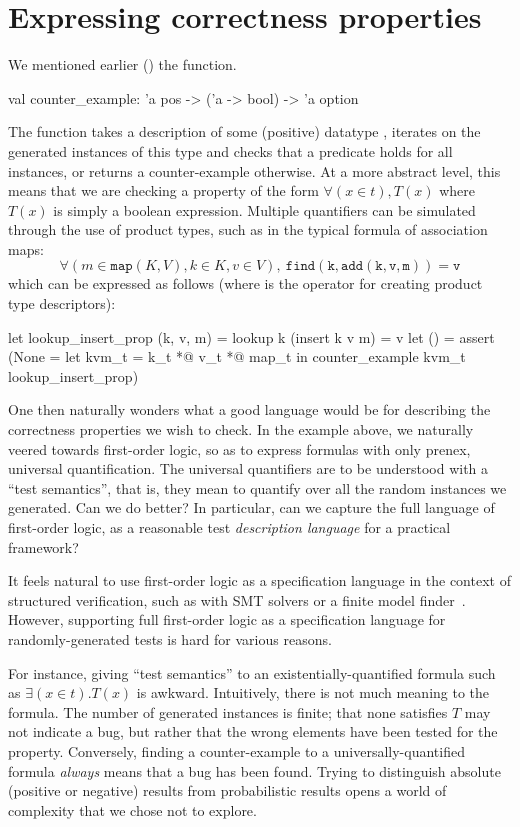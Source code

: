 \section{Expressing correctness properties}
\label{sec:properties}

We mentioned earlier () the  function.
%
\begin{ocamlcode}
val counter_example: 'a pos -> ('a -> bool) -> 'a option
\end{ocamlcode}
%
The function takes a description of some (positive) datatype
, iterates on the generated instances of this type and checks
that a predicate  holds for all instances, or returns
a counter-example otherwise. At a more abstract level, this means that we are
checking a property of the form $ \forall (x \in t), T(x) $ where
$T(x)$ is simply a boolean expression.
Multiple quantifiers can be simulated through the use of product types, such as
in the typical formula of association maps:
%
\[
\forall (m \in \mathtt{map}(K,V), k \in K, v \in V),
  \ \mathtt{find(k,add(k,v,m)) = v}
\]
%
which can be expressed as follows (where  is the operator for creating
product type descriptors):
%
\begin{ocamlcode}
let lookup_insert_prop (k, v, m) =
  lookup k (insert k v m) = v
let () = assert (None =
  let kvm_t = k_t *@ v_t *@ map_t in
  counter_example kvm_t lookup_insert_prop)
\end{ocamlcode}

One then naturally wonders what a good language would be for describing the
correctness properties we wish to check. In the example above, we naturally
veered towards first-order logic, so as to express formulas with only prenex,
universal quantification. The universal quantifiers are to be understood with a
``test semantics'', that is, they mean to quantify over all the random instances
we generated.
%
Can we do better? In particular, can we capture the full language of first-order
logic, as a reasonable test \emph{description language} for a practical
framework?

It feels natural to use first-order logic as a specification language
in the context of structured verification, such as with SMT solvers or
a finite model finder~\cite{DBLP:conf/itp/BlanchetteN10}.  However,
supporting full first-order logic as a specification language for
randomly-generated tests is hard for various reasons.

For instance, giving ``test semantics'' to an existentially-quantified formula
such as $\exists(x \in t). T(x)$ is awkward. Intuitively, there is not much
meaning to the formula. The number of generated instances is finite; that none
satisfies $T$ may not indicate a bug, but rather that the wrong elements have
been tested for the property. Conversely, finding a counter-example to a
universally-quantified formula \emph{always} means that a bug has been found.
%
Trying to distinguish absolute (positive or negative) results from probabilistic
results opens a world of complexity that we chose not to explore.

